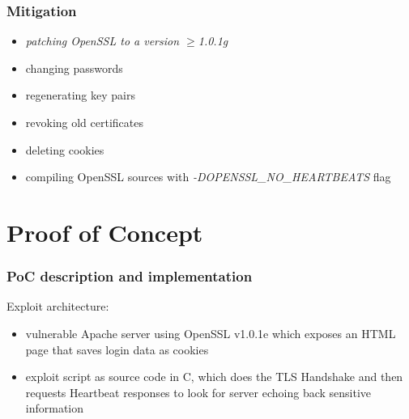 \documentclass[
    11pt, %
    aspectratio=169, %
]{beamer}
\begin{document}
\begin{frame}
	\frametitle{Mitigation}
            \begin{itemize}
                \item \emph{patching OpenSSL to a version $\geq$1.0.1g}
                \newline
                \item changing passwords
                \newline
                \item regenerating key pairs
                \newline
                \item revoking old certificates
                \newline
                \item deleting cookies
                \newline
                \item compiling OpenSSL sources with \emph{-DOPENSSL\_NO\_HEARTBEATS} flag
            \end{itemize}
\end{frame}

\section{Proof of Concept}

\begin{frame}
	\frametitle{PoC description and implementation}
 Exploit architecture:
        \begin{itemize}
            \item vulnerable Apache server using OpenSSL v1.0.1e which exposes an HTML page that saves login data as cookies
            \newline
            \newline
            \newline
            \item exploit script as source code in C, which does the TLS Handshake \newline and then requests Heartbeat responses to look for server echoing \newline back sensitive information
        \end{itemize}
    	
    	
    	
\end{frame}
\end{document}
